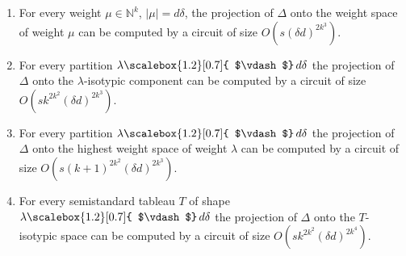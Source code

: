 \documentclass[10pt,a4paper]{article}
\begin{document}
\begin{enumerate}


\item 
 


For every weight $\mu\in\mathbb{N}^{k}$, $|\mu|=d\delta$, the projection of $\Delta$ onto the weight space of weight $\mu$ can be computed by a circuit of size $O(s(\delta d)^{2k^{3}})$.





\item 
 


For every partition $\lambda\mathchoice{\scalebox{1.2}[0.7]{ $\vdash$}\,}{\scalebox{1.2}[0.7]{ $\vdash$}\,}{\scalebox{0.7}{\scalebox{1.2}[0.7]{$\vdash$}}\,}{\scalebox{0.5}{\scalebox{1.2}[0.7]{$\vdash$}}\,}d\delta$ the projection of $\Delta$ onto the $\lambda$-isotypic component can be computed by a circuit of size $O(sk^{2k^{2}}(\delta d)^{2k^{3}})$.





\item 
 


For every partition $\lambda\mathchoice{\scalebox{1.2}[0.7]{ $\vdash$}\,}{\scalebox{1.2}[0.7]{ $\vdash$}\,}{\scalebox{0.7}{\scalebox{1.2}[0.7]{$\vdash$}}\,}{\scalebox{0.5}{\scalebox{1.2}[0.7]{$\vdash$}}\,}d\delta$ the projection of $\Delta$ onto the highest weight space of weight $\lambda$ can be computed by a circuit of size $O(s(k+1)^{2k^{2}}(\delta d)^{2k^{3}})$.





\item 
 


For every semistandard tableau $T$ of shape $\lambda\mathchoice{\scalebox{1.2}[0.7]{ $\vdash$}\,}{\scalebox{1.2}[0.7]{ $\vdash$}\,}{\scalebox{0.7}{\scalebox{1.2}[0.7]{$\vdash$}}\,}{\scalebox{0.5}{\scalebox{1.2}[0.7]{$\vdash$}}\,}d\delta$ the projection of $\Delta$ onto the $T$-isotypic space can be computed by a circuit of size $O(sk^{2k^{2}}(\delta d)^{2k^{4}})$.





\end{enumerate}



\end{document}
